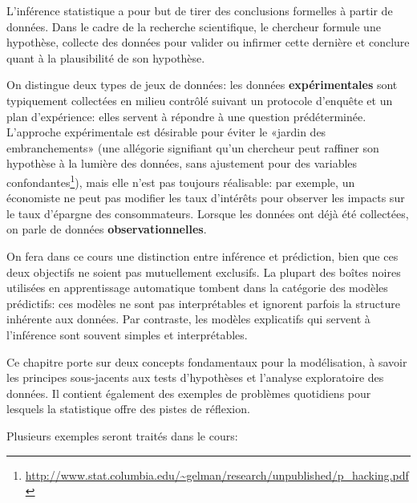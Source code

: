 \documentclass[
  11pt,
  letterpaper,
]{book}
\renewcommand{\href}[2]{#2\footnote{\url{#1}}}
\begin{document}
L'inférence statistique a pour but de tirer des conclusions formelles à partir de données. Dans le cadre de la recherche scientifique, le chercheur formule une hypothèse, collecte des données pour valider ou infirmer cette dernière et conclure quant à la plausibilité de son hypothèse.

On distingue deux types de jeux de données: les données \textbf{expérimentales} sont typiquement collectées en milieu contrôlé suivant un protocole d'enquête et un plan d'expérience: elles servent à répondre à une question prédéterminée. L'approche expérimentale est désirable pour éviter le «jardin des embranchements» (une \href{http://www.stat.columbia.edu/~gelman/research/unpublished/p_hacking.pdf}{allégorie signifiant qu'un chercheur peut raffiner son hypothèse à la lumière des données, sans ajustement pour des variables confondantes}), mais elle n'est pas toujours réalisable: par exemple, un économiste ne peut pas modifier les taux d'intérêts pour observer les impacts sur le taux d'épargne des consommateurs. Lorsque les données ont déjà été collectées, on parle de données \textbf{observationnelles}.

On fera dans ce cours une distinction entre inférence et prédiction, bien que ces deux objectifs ne soient pas mutuellement exclusifs. La plupart des boîtes noires utilisées en apprentissage automatique tombent dans la catégorie des modèles prédictifs: ces modèles ne sont pas interprétables et ignorent parfois la structure inhérente aux données. Par contraste, les modèles explicatifs qui servent à l'inférence sont souvent simples et interprétables.

Ce chapitre porte sur deux concepts fondamentaux pour la modélisation, à savoir les principes sous-jacents aux tests d'hypothèses et l'analyse exploratoire des données. Il contient également des exemples de problèmes quotidiens pour lesquels la statistique offre des pistes de réflexion.

Plusieurs exemples seront traités dans le cours:
\end{document}
